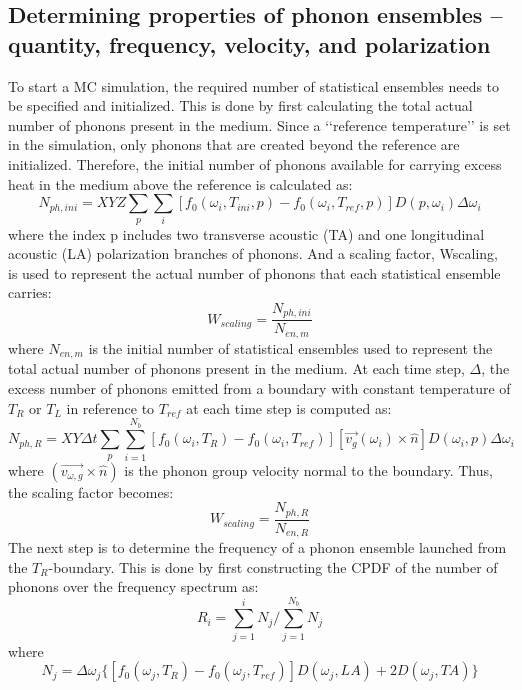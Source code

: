 \subsection*{Determining properties of phonon ensembles – quantity,
frequency, velocity, and polarization}
To start a MC simulation, the required number of statistical
ensembles needs to be specified and initialized. This is done by
first calculating the total actual number of phonons present in
the medium. Since a ‘‘reference temperature’’ is set in the simulation,
only phonons that are created beyond the reference are initialized.
Therefore, the initial number of phonons available for
carrying excess heat in the medium above the reference is calculated
as:
\begin{equation}
N_{ph,ini}=XYZ \sum_p \sum_i [f_0(\omega_i,T_{ini},p)-f_0(\omega_i,T_{ref},p)]D(p,\omega_i)\Delta \omega_i
\end{equation}
where the index p includes two transverse acoustic (TA) and one
longitudinal acoustic (LA) polarization branches of phonons.
And a scaling
factor, Wscaling, is used to represent the actual number of phonons
that each statistical ensemble carries:
\begin{equation}
W_{scaling}=\frac{N_{ph,ini}}{N_{en,m}}
\end{equation}
where $N_{en,m}$ is the initial number of statistical ensembles used to represent the total actual number of phonons present in the medium. At each time step, $\Delta$, the excess number of phonons emitted from a boundary with constant temperature of $T_R$ or $T_L$ in reference to $T_{ref}$ at each time step is computed as:
\begin{equation}
N_{ph,R}=XY {\Delta t} \sum_p \sum_{i=1}^{N_b}[f_0( \omega_i,T_R)-f_0( \omega_i,T_{ref})][ \vec{v_g}( \omega_i) \times \hat{n}]D( \omega_i,p) \Delta \omega_i
\end{equation}
where $(\vec{v_{\omega,g}} \times \hat{n})$ is the phonon group velocity normal to the boundary. Thus, the scaling factor becomes:
\begin{equation}
W_{scaling}=\frac{N_{ph,R}}{N_{en,R}}
\end{equation}
The next step is to determine the frequency of a phonon ensemble
launched from the $T_R$-boundary. This is done by first constructing
the CPDF of the number of phonons over the frequency spectrum
as:
\begin{equation}
R_i=\sum_{j=1}^i N_j / \sum_{j=1}^{N_b} N_j  \label{con:R}
\end{equation}
where
\begin{equation}
N_j=\Delta \omega _j  \lbrace [f_0(\omega_j,T_R) - f_0(\omega_j,T_{ref})] D(\omega_j, LA) +2 D(\omega_j, TA) \rbrace 
\end{equation}
